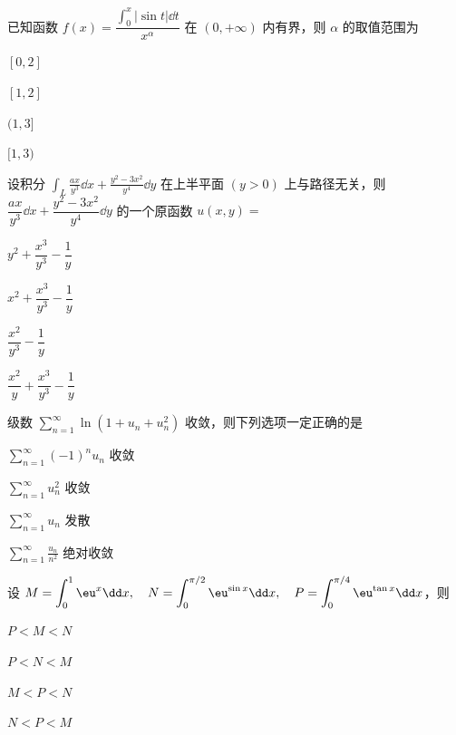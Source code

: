 
\begin{question}[index=1]
已知函数 $f(x)=\dfrac{\displaystyle\int_0^x|\sin t|\dd t}{x^\alpha}$ 在 $(0,+\infty)$ 内有界，则 $\alpha$ 的取值范围为
\begin{choices}[columns=4]
\item $[0,2]$
\item $[1,2]$
\item $(1,3]$
\item $[1,3)$
\end{choices}
\end{question}
\QuestionBreak

\begin{question}[index=2]
设积分 $\displaystyle\int_L\frac{ax}{y^3}\dd x+\frac{y^2-3x^2}{y^4}\dd y$ 在上半平面 $(y>0)$ 上与路径无关，则 $\dfrac{ax}{y^3}\dd x+\dfrac{y^2-3x^2}{y^4}\dd y$ \allowbreak\mbox{的一个原函数} $u(x,y)=$
\begin{choices}[columns=2]
\item $y^2+\dfrac{x^3}{y^3}-\dfrac1y$
\item $x^2+\dfrac{x^3}{y^3}-\dfrac1y$
\item $\dfrac{x^2}{y^3}-\dfrac1y$
\item $\dfrac{x^2}{y}+\dfrac{x^3}{y^3}-\dfrac1y$
\end{choices}
\end{question}
\QuestionBreak

\begin{question}[index=3]
级数 $\displaystyle\sum_{n=1}^{\infty}\ln(1+u_n+u_n^2)$ 收敛，则下列选项一定正确的是
\begin{choices}[columns=2]
\item $\displaystyle\sum_{n=1}^{\infty}(-1)^nu_n$ 收敛
\item $\displaystyle\sum_{n=1}^{\infty}u_n^2$ 收敛
\item $\displaystyle\sum_{n=1}^{\infty}u_n$ 发散
\item $\displaystyle\sum_{n=1}^{\infty}\frac{u_n}{n^2}$ 绝对收敛
\end{choices}
\end{question}
\QuestionBreak

\begin{question}[index=4]
设 $\displaystyle M=\int_0^1\eu^x\dd x,\quad N=\int_0^{\pi/2}\eu^{\sin x}\dd x,\quad P=\int_0^{\pi/4}\eu^{\tan x}\dd x$，则
\begin{choices}[columns=4]
\item $P<M<N$
\item $P<N<M$
\item $M<P<N$
\item $N<P<M$
\end{choices}
\end{question}
\QuestionBreak

